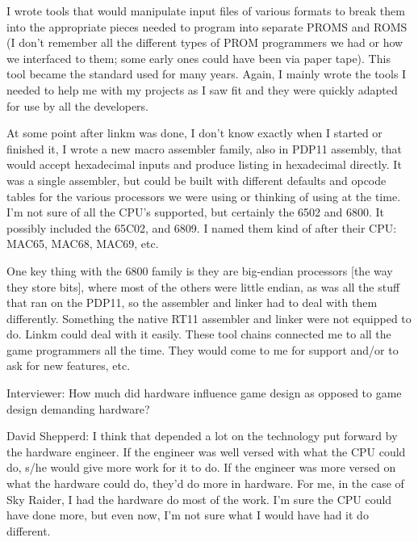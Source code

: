 I wrote tools that would manipulate input files of various formats to break them into the appropriate pieces needed to program into separate PROMS and ROMS (I don't remember all the different types of PROM programmers we had or how we interfaced to them; some early ones could have been via paper tape). This tool became the standard used for many years. Again, I mainly wrote the tools I needed to help me with my projects as I saw fit and they were quickly adapted for use by all the developers.

At some point after linkm was done, I don't know exactly when I started or finished it, I wrote a new macro assembler family, also in PDP11 assembly, that would accept hexadecimal inputs and produce listing in hexadecimal directly. It was a single assembler, but could be built with different defaults and opcode tables for the various processors we were using or thinking of using at the time. I'm not sure of all the CPU's supported, but certainly the 6502 and 6800. It possibly included the 65C02, and 6809. I named them kind of after their CPU: MAC65, MAC68, MAC69, etc. 

One key thing with the 6800 family is they are big-endian processors [the way they store bits], where most of the others were little endian, as was all the stuff that ran on the PDP11, so the assembler and linker had to deal with them differently. Something the native RT11 assembler and linker were not equipped to do. Linkm could deal with it easily. These tool chains connected me to all the game programmers all the time. They would come to me for support and/or to ask for new features, etc.

\textcolor{interviewer}{Interviewer:} How much did hardware influence game design as opposed to game design demanding hardware?

\textcolor{interviewee}{David Shepperd:} I think that depended a lot on the technology put forward by the hardware engineer. If the engineer was well versed with what the CPU could do, s/he would give more work for it to do. If the engineer was more versed on what the hardware could do, they'd do more in hardware. For me, in the case of Sky Raider, I had the hardware do most of the work. I'm sure the CPU could have done more, but even now, I'm not sure what I would have had it do different.


